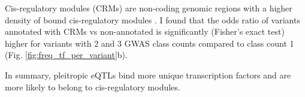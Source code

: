 Cis-regulatory modules (CRMs) are non-coding genomic regions with a higher density of bound cis-regulatory modules \citep{2021.Ballester.Hammal}.
%
I found that the odds ratio of variants annotated with CRMs vs non-annotated is significantly (Fisher's exact test) higher for variants with 2 and 3 GWAS class counts compared to class count 1 (Fig. \ref{fig:freq_tf_per_variant}b).

In summary, pleitropic eQTLs bind more unique transcription factors and are more
likely to belong to cis-regulatory modules.

%
%
%
